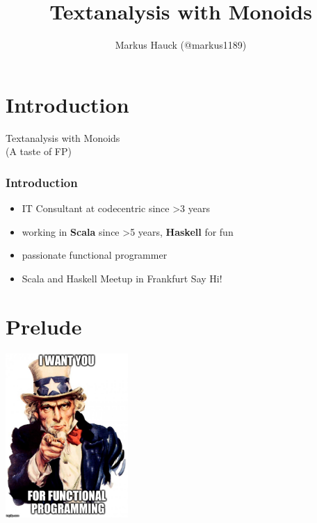 \documentclass[aspectratio=169]{beamer}
\title{Textanalysis with Monoids}
\author{Markus Hauck (@markus1189)}
\begin{document}
\begin{frame}
  \titlepage{}
\end{frame}

\section{Introduction}\label{sec:introduction}

\begin{frame}
  \begin{center}
    {\Huge Textanalysis with Monoids\\}
    (A taste of FP)
  \end{center}
\end{frame}

\begin{frame}
  \frametitle{Introduction}
  \begin{itemize}
  \item IT Consultant at codecentric since >3 years
  \item working in \textbf{Scala} since >5 years, \textbf{Haskell} for fun
  \item passionate functional programmer
  \item Scala and Haskell Meetup in Frankfurt \textemdash{} Say Hi!
  \end{itemize}
\end{frame}

\section{Prelude}\label{sec:prelude}

\begin{frame}
  \begin{center}
    \includegraphics[width=0.35\textwidth]{static-images/want-you.jpg}
  \end{center}
\end{frame}
\end{document}
